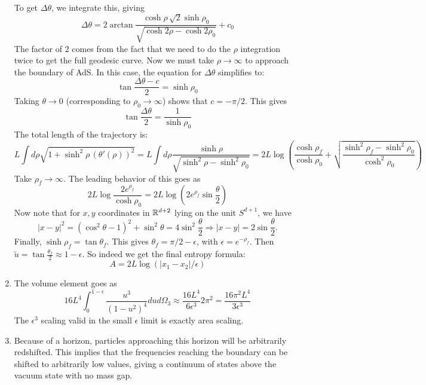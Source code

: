 \documentclass[11pt, class=article, crop=false]{standalone}
\begin{document}
\begin{enumerate}
	To get $\Delta \theta$, we integrate this, giving
	\[
		\Delta \theta = 2 \arctan \frac{\cosh \rho\, \sqrt{2} \sinh \rho_0}{\sqrt{\cosh 2 \rho - \cosh 2 \rho_0}} + c_0
	\]
	The factor of $2$ comes from the fact that we need to do the $\rho$ integration twice to get the full geodesic curve. Now we must take $\rho \to \infty$ to approach the boundary of AdS. In this case, the equation for $\Delta \theta$ simplifies to:
	\[
		\tan \frac{\Delta \theta - c}{2}  = \sinh \rho_0
	\]
	Taking $\theta \to 0$ (corresponding to $\rho_0 \to \infty$) shows that $c = -\pi /2$. This gives
	\[
		\tan \frac{\Delta \theta }{2}  = \frac{1}{\sinh \rho_0}
	\]
	The total length of the trajectory is:
	\[
		L \int d\rho \sqrt{1 + \sinh^2 \rho
		\, (\theta'(\rho))^2} = L \int d\rho \frac{\sinh \rho}{\sqrt{\sinh^2 \rho - \sinh^2 \rho_0}} = 2 L  \log\left(\frac{\cosh \rho_f}{\cosh \rho_0}  +  \sqrt{\frac{\sinh^2 \rho_f - \sinh^2 \rho_0}{\cosh^2 \rho_0}}\right)
	\]
	Take $\rho_f \to \infty$. The leading behavior of this goes as
	\[
		2 L \log \frac{2 e^{\rho_f}}{\cosh \rho_0} = 2 L \log \left(2 e^{\rho_f} \sin \frac{\theta}{2} \right)
	\]
	Now note that for $x, y$ coordinates in $\mathbb{R}^{d+2}$ lying on the unit $S^{d+1}$, we have 
	\[
		|x-y|^2 = (\cos^2 \theta - 1)^2 + \sin^2 \theta = 4 \sin^2 \frac{\theta}{2} \Rightarrow |x-y| = 2 \sin \frac{\theta}{2}.
	\]
	Finally, $\sinh \rho_f = \tan \theta_f$. This gives $\theta_f = \pi/2 - \epsilon$, with $\epsilon = e^{-\rho_f}$. Then $\tilde u = \tan \frac{\theta_f}{2} \approx 1-\epsilon$. So indeed we get the final entropy formula:
	\[
		A = 2 L \log (|x_1-x_2|/\epsilon)
	\]
	
	\item The volume element goes as
	\[
		16 L^4 \int_0^{1-\epsilon} \frac{u^3}{(1-u^2)^4} du d\Omega_3 \approx \frac{16 L^4}{6 \epsilon^3} 2 \pi^2 = \frac{16 \pi^2 L^4}{3 \epsilon^3}
	\]
	The $\epsilon^3$ scaling valid in the small $\epsilon$ limit is exactly area scaling.
	
	\item Because of a horizon, particles approaching this horizon will be arbitrarily redshifted. This implies that the frequencies reaching the boundary can be shifted to arbitrarily low values, giving a continuum of states above the vacuum state with no mass gap.
	

\end{enumerate}
\end{document}
